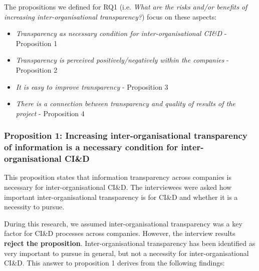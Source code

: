 The propositions we defined for  
RQ1 (i.e. {\em What are the risks and/or benefits of increasing inter-organisational transparency?}) focus on these aspects:

\begin{itemize}
\item {\em Transparency as necessary condition for  inter-organisational CI\&D} - Proposition 1 %
\item {\em Transparency is perceived positively/negatively within the companies} - Proposition 2 %
\item {\em It is easy to improve transparency} - Proposition 3 %
\item {\em There is a connection between transparency and quality of results of the project} - Proposition 4 %
\end{itemize}

\vspace{.2cm}
\subsubsection{Proposition 1: Increasing inter-organisational transparency of information is a necessary condition for inter-organisational CI\&D}

This proposition states that information transparency across companies is necessary for inter-organisational CI\&D. The interviewees were asked how important inter-organisational transparency is for CI\&D and whether it is a necessity to pursue. 

During this research, we assumed inter-organisational transparency was a key factor for CI\&D processes across companies. However, the interview results {\bf reject the proposition}. Inter-organisational transparency has been identified as very important to pursue in general, but not a necessity for inter-organisational CI\&D. This answer to proposition 1 derives from the following findings:

